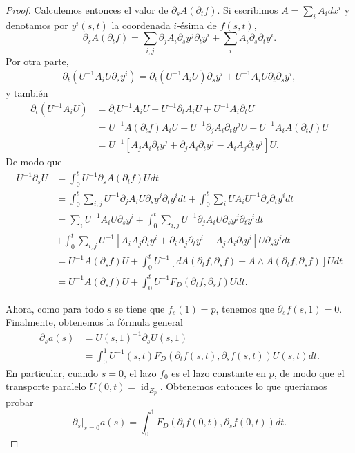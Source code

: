 \documentclass[12pt,a4paper]{article}
\theoremstyle{definition} \newtheorem{defn}[thm]{Definición}
\theoremstyle{definition} \newtheorem{ejemplo}[thm]{Ejemplo}
\theoremstyle{definition} \newtheorem{ejercicio}[thm]{Ejercicio}
\DeclareMathOperator{\id}{id}
\begin{document}
\begin{proof}
	      Calculemos entonces el valor de $\partial_s A(\partial_t f)$. Si escribimos $A=\sum_i A_i dx^i$ y denotamos por $y^i(s,t)$ la coordenada $i$-ésima de $f(s,t)$, 
	      \begin{equation*}
		\partial_s A(\partial_t f) = \sum_{i,j} \partial_j A_i \partial_s y^j \partial_t y^i + \sum_i A_i \partial_s \partial_t y^i.
	      \end{equation*}
	      Por otra parte,
	      \begin{align*}
		\partial_t (U^{-1} A_i U \partial_s y^i ) = \partial_t(U^{-1}A_i U) \partial_s y^i + U^{-1} A_i U \partial_t \partial_s y^i,
	      \end{align*}
y también
	      \begin{align*}
		\partial_t (U^{-1} A_i U) &= \partial_t U^{-1} A_i U + U^{-1} \partial_t A_i U + U^{-1} A_i \partial_t U \\
		&= U^{-1} A(\partial_t f) A_i U + U^{-1} \partial_j A_i \partial_t y^j U  - U^{-1} A_i A(\partial_t f) U \\
		&= U^{-1}[ A_j A_i \partial_t y^j + \partial_j A_i \partial_t y^j - A_i A_j \partial_t y^j]U.
	      \end{align*}
De modo que
\begin{align*}
  U^{-1} \partial_s U &= \int_0^t U^{-1} \partial_s A(\partial_t f) U dt \\ &= \int_0^t \sum_{i,j}U^{-1} \partial_j A_i U \partial_s y^j \partial_t y^i dt + \int_0^t \sum_i U A_i U^{-1} \partial_s \partial_t y^i dt\\
  &= \sum_i U^{-1} A_i U \partial_s y^i +\int_0^t \sum_{i,j}U^{-1} \partial_j A_i U \partial_s y^j \partial_t y^i dt \\ & + \int_0^t \sum_{i,j}  U^{-1}[ A_i A_j \partial_t y^i + \partial_i A_j \partial_t y^i - A_j A_i \partial_t y^i]U \partial_s y^j dt\\
  &= U^{-1} A(\partial_s f) U+ \int_0^t U^{-1}[ dA(\partial_t f,\partial_s f) +A\wedge A(\partial_t f, \partial_s f)] U dt \\
  &= U^{-1} A(\partial_s f) U + \int_0^t U^{-1} F_D(\partial_t f,\partial_s f) U dt.
\end{align*}

Ahora, como para todo $s$ se tiene que $f_s(1)=p$, tenemos que $\partial_s f(s,1)=0$.
Finalmente, obtenemos la fórmula general
\begin{align*}
  \partial_s a(s) &= U(s,1)^{-1} \partial_s U (s,1) \\ & = \int_0^1 U^{-1}(s,t) F_D(\partial_t f(s,t), \partial_s f(s,t)) U(s,t) dt.
\end{align*}
En particular, cuando $s=0$, el lazo $f_0$ es el lazo constante en $p$, de modo que el transporte paralelo $U(0,t)=\id_{E_p}$. Obtenemos entonces lo que queríamos probar
\begin{equation*}
  \partial_s|_{s=0} a(s) = \int_0^1 F_D(\partial_t f(0,t),\partial_s f(0,t))dt.
\end{equation*}
	  \end{proof}
\end{document}
